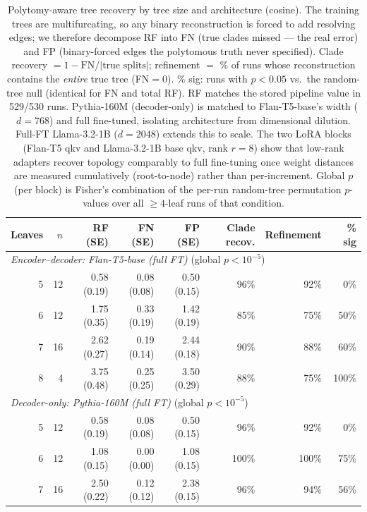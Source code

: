 \documentclass{article}
\theoremstyle{definition}
\theoremstyle{plain}
\begin{document}
\begin{table}[t]
\caption{Polytomy-aware tree recovery by tree size and architecture (cosine). The training
  trees are multifurcating, so any binary reconstruction is forced to add resolving edges;
  we therefore decompose RF into FN (true clades missed --- the real error) and FP
  (binary-forced edges the polytomous truth never specified). Clade recovery
  $= 1 - \mathrm{FN}/|\text{true splits}|$; refinement $=$ \% of runs whose reconstruction
  contains the \emph{entire} true tree (FN$=0$). \% sig: runs with $p<0.05$ vs.\ the
  random-tree null (identical for FN and total RF). RF matches the stored pipeline value in
  529/530 runs. Pythia-160M (decoder-only) is matched to Flan-T5-base's width ($d=768$) and
  full fine-tuned, isolating architecture from dimensional dilution. Full-FT Llama-3.2-1B
  ($d=2048$) extends this to scale. The two LoRA blocks (Flan-T5 qkv and Llama-3.2-1B base qkv,
  rank $r=8$) show that low-rank adapters recover topology comparably to full fine-tuning once
  weight distances are measured cumulatively (root-to-node) rather than per-increment. Global $p$
  (per block) is Fisher's combination of the per-run random-tree permutation $p$-values over all
  $\geq 4$-leaf runs of that condition.}
\label{tab:rf_by_leaves}
\begin{center}
\begin{tabular}{rrrrrrrr}
\toprule
Leaves & $n$ & RF (SE) & FN (SE) & FP (SE) & Clade recov. & Refinement & \% sig \\
\midrule
\multicolumn{8}{l}{\textit{Encoder--decoder: Flan-T5-base (full FT)} \quad(global $p<10^{-5}$)} \\
5 & 12 & 0.58 (0.19) & 0.08 (0.08) & 0.50 (0.15) & 96\% & 92\% &   0\% \\
6 & 12 & 1.75 (0.35) & 0.33 (0.19) & 1.42 (0.19) & 85\% & 75\% &  50\% \\
7 & 16 & 2.62 (0.27) & 0.19 (0.14) & 2.44 (0.18) & 90\% & 88\% &  60\% \\
8 &  4 & 3.75 (0.48) & 0.25 (0.25) & 3.50 (0.29) & 88\% & 75\% & 100\% \\
\midrule
\multicolumn{8}{l}{\textit{Decoder-only: Pythia-160M (full FT)} \quad(global $p<10^{-5}$)} \\
5 & 12 & 0.58 (0.19) & 0.08 (0.08) & 0.50 (0.15) & 96\% & 92\% &   0\% \\
6 & 12 & 1.08 (0.15) & 0.00 (0.00) & 1.08 (0.15) & 100\% & 100\% &  75\% \\
7 & 16 & 2.50 (0.22) & 0.12 (0.12) & 2.38 (0.15) & 96\% & 94\% &  56\% \\

\end{tabular}
\end{center}
\end{table}
\end{document}
